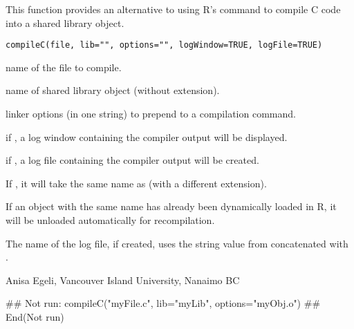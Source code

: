 \documentclass[letterpaper]{book}
\begin{document}
\begin{Description}\relax
This function provides an alternative to using R's  
command to compile C code into a shared library object.
\end{Description}
\begin{Usage}
\begin{verbatim}
compileC(file, lib="", options="", logWindow=TRUE, logFile=TRUE)
\end{verbatim}
\end{Usage}
\begin{Arguments}
\begin{ldescription}
\item[\code{file}] name of the file to compile.
\item[\code{lib}] name of shared library object (without extension).
\item[\code{options}] linker options (in one string) to prepend to a compilation command.
\item[\code{logWindow}] if , a log window containing the compiler output will be displayed.
\item[\code{logFile}] if , a log file containing the compiler output will be created.
\end{ldescription}
\end{Arguments}
\begin{Details}\relax
If , it will take the same name as  (with a different extension).

If an object with the same name has already been dynamically loaded in R, 
it will be unloaded automatically for recompilation.

The name of the log file, if created, uses the string value from  
concatenated with .
\end{Details}
\begin{Author}\relax
Anisa Egeli, Vancouver Island University, Nanaimo BC
\end{Author}
\begin{SeeAlso}\relax
{}
\end{SeeAlso}
\begin{Examples}
\begin{ExampleCode}
## Not run: 
compileC("myFile.c", lib="myLib", options="myObj.o")
## End(Not run)
\end{ExampleCode}
\end{Examples}
\end{document}

